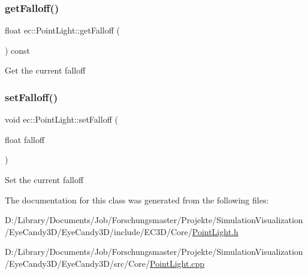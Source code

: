 \subsubsection{\texorpdfstring{get\+Falloff()}{getFalloff()}}
{\footnotesize\ttfamily float ec\+::\+Point\+Light\+::get\+Falloff (\begin{DoxyParamCaption}{ }\end{DoxyParamCaption}) const}

Get the current falloff \mbox{\label{classec_1_1_point_light_a64949f08f93b178b110f9c366d72ce89}} 
\subsubsection{\texorpdfstring{set\+Falloff()}{setFalloff()}}
{\footnotesize\ttfamily void ec\+::\+Point\+Light\+::set\+Falloff (\begin{DoxyParamCaption}\item[{float}]{falloff }\end{DoxyParamCaption})}

Set the current falloff 

The documentation for this class was generated from the following files\+:\begin{DoxyCompactItemize}
\item 
D\+:/\+Library/\+Documents/\+Job/\+Forschungsmaster/\+Projekte/\+Simulation\+Visualization/\+Eye\+Candy3\+D/\+Eye\+Candy3\+D/include/\+E\+C3\+D/\+Core/\mbox{\hyperlink{_point_light_8h}{Point\+Light.\+h}}\item 
D\+:/\+Library/\+Documents/\+Job/\+Forschungsmaster/\+Projekte/\+Simulation\+Visualization/\+Eye\+Candy3\+D/\+Eye\+Candy3\+D/src/\+Core/\mbox{\hyperlink{_point_light_8cpp}{Point\+Light.\+cpp}}\end{DoxyCompactItemize}
